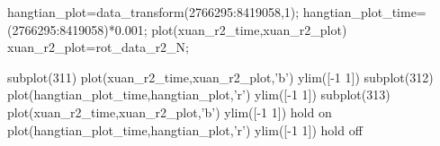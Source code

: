 hangtian_plot=data_transform(2766295:8419058,1);
hangtian_plot_time=(2766295:8419058)*0.001;
plot(xuan_r2_time,xuan_r2_plot)
xuan_r2_plot=rot_data_r2_N;




subplot(311)
plot(xuan_r2_time,xuan_r2_plot,'b')
ylim([-1 1])
subplot(312)
plot(hangtian_plot_time,hangtian_plot,'r')
ylim([-1 1])
subplot(313)
plot(xuan_r2_time,xuan_r2_plot,'b')
ylim([-1 1])
hold on
plot(hangtian_plot_time,hangtian_plot,'r')
ylim([-1 1])
hold off